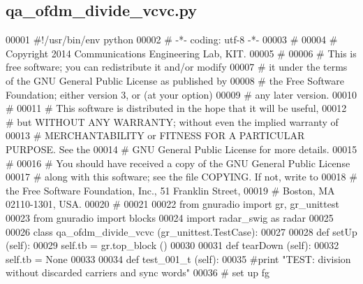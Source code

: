 \subsection{qa\+\_\+ofdm\+\_\+divide\+\_\+vcvc.\+py}
\label{qa__ofdm__divide__vcvc_8py_source}

\begin{DoxyCode}
00001 \textcolor{comment}{#!/usr/bin/env python}
00002 \textcolor{comment}{# -*- coding: utf-8 -*-}
00003 \textcolor{comment}{# }
00004 \textcolor{comment}{# Copyright 2014 Communications Engineering Lab, KIT.}
00005 \textcolor{comment}{# }
00006 \textcolor{comment}{# This is free software; you can redistribute it and/or modify}
00007 \textcolor{comment}{# it under the terms of the GNU General Public License as published by}
00008 \textcolor{comment}{# the Free Software Foundation; either version 3, or (at your option)}
00009 \textcolor{comment}{# any later version.}
00010 \textcolor{comment}{# }
00011 \textcolor{comment}{# This software is distributed in the hope that it will be useful,}
00012 \textcolor{comment}{# but WITHOUT ANY WARRANTY; without even the implied warranty of}
00013 \textcolor{comment}{# MERCHANTABILITY or FITNESS FOR A PARTICULAR PURPOSE.  See the}
00014 \textcolor{comment}{# GNU General Public License for more details.}
00015 \textcolor{comment}{# }
00016 \textcolor{comment}{# You should have received a copy of the GNU General Public License}
00017 \textcolor{comment}{# along with this software; see the file COPYING.  If not, write to}
00018 \textcolor{comment}{# the Free Software Foundation, Inc., 51 Franklin Street,}
00019 \textcolor{comment}{# Boston, MA 02110-1301, USA.}
00020 \textcolor{comment}{# }
00021 
00022 \textcolor{keyword}{from} gnuradio \textcolor{keyword}{import} gr, gr\_unittest
00023 \textcolor{keyword}{from} gnuradio \textcolor{keyword}{import} blocks
00024 \textcolor{keyword}{import} radar\_swig \textcolor{keyword}{as} radar
00025 
00026 \textcolor{keyword}{class }qa_ofdm_divide_vcvc (gr\_unittest.TestCase):
00027 
00028     \textcolor{keyword}{def }setUp (self):
00029         self.tb = gr.top\_block ()
00030 
00031     \textcolor{keyword}{def }tearDown (self):
00032         self.tb = \textcolor{keywordtype}{None}
00033 
00034     \textcolor{keyword}{def }test_001_t (self):
00035         \textcolor{comment}{#print "TEST: division without discarded carriers and sync words"}
00036         \textcolor{comment}{# set up fg}

\end{DoxyCode}
